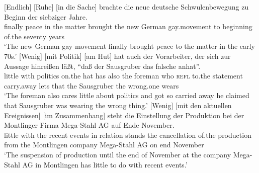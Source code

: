 \eal
\label{drei-und-mehr-idiomatisch}
\ex 
\gll {}[Endlich] [Ruhe] [in die Sache] brachte die neue deutsche Schwulenbewegung zu Beginn der siebziger Jahre.\footnotemark\\
	  \spacebr{}finally  \spacebr{}peace  \spacebr{}in the matter brought the new German gay.movement to beginning of.the seventy years\\ 
\glt `The new German gay movement finally brought peace to the matter in the early 70s.'
\ex
\gll {}[Wenig] [mit Politik] [am Hut] hat auch der Vorarbeiter, der sich zur Aussage hinreißen läßt, "`daß der Sausgruber das falsche anhat"'.\footnotemark\\
	 \spacebr{}little  \spacebr{}with politics  \spacebr{}on.the hat has also the foreman who \textsc{refl} to.the statement carry.away lets that the Sausgruber the wrong.one wears\\
\label{bsp-wenig-mit-politik-am-hut-hat}
\glt `The foreman also cares little about politics and got so carried away he claimed that Sausgruber was wearing the wrong thing.'
\ex
\gll {}[Wenig] [mit den aktuellen Ereignissen] [im Zusammenhang] steht die Einstellung der Produktion bei der Montlinger Firma Mega-Stahl AG auf Ende November.\footnotemark\\
	 \spacebr{}little  \spacebr{}with the recent events  \spacebr{}in relation stands the
         cancellation of.the production from the Montlingen company Mega-Stahl AG on end November\\
\glt `The suspension of production until the end of November at the company Mega-Stahl AG in Montlingen has little to do with recent events.'
